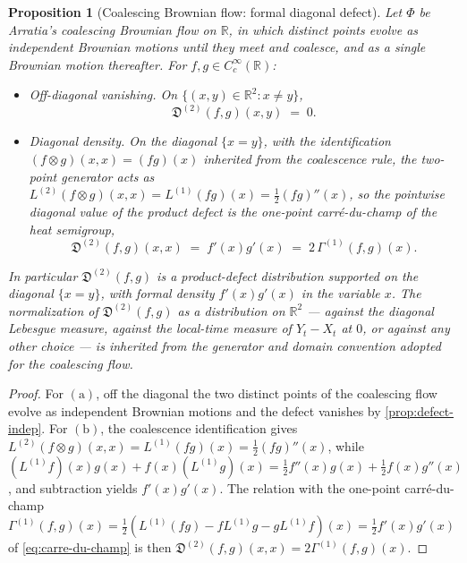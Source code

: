 \documentclass[11pt,reqno]{amsart}
\theoremstyle{plain}
\newtheorem{proposition}[theorem]{Proposition}
\theoremstyle{definition}
\theoremstyle{remark}
\newcommand{\R}{\mathbb{R}}
\begin{document}
\begin{proposition}[Coalescing Brownian flow: formal diagonal defect]\label{prop:defect-coalescing}
Let $\Phi$ be Arratia's coalescing Brownian flow on $\R$, in which
distinct points evolve as independent Brownian motions until they
meet and coalesce, and as a single Brownian motion thereafter. For
$f,g\in C_c^{\infty}(\R)$:
\begin{itemize}
\item[$(\mathrm a)$] \emph{Off-diagonal vanishing.} On
$\{(x,y)\in\R^{2}:x\neq y\}$,
\begin{equation}\label{eq:defect-coalescing-offdiag}
  \mathfrak D^{(2)}(f,g)(x,y)\;=\;0.
\end{equation}
\item[$(\mathrm b)$] \emph{Diagonal density.} On the diagonal
$\{x=y\}$, with the identification
$(f\otimes g)(x,x)=(fg)(x)$ inherited from the coalescence rule,
the two-point generator acts as
$L^{(2)}(f\otimes g)(x,x)=L^{(1)}(fg)(x)=\tfrac{1}{2}(fg)''(x)$, so
the pointwise diagonal value of the product defect is the one-point
carr\'e-du-champ of the heat semigroup,
\begin{equation}\label{eq:defect-coalescing-diag}
  \mathfrak D^{(2)}(f,g)(x,x)
  \;=\;f'(x)g'(x)
  \;=\;2\,\Gamma^{(1)}(f,g)(x).
\end{equation}
\end{itemize}
In particular $\mathfrak D^{(2)}(f,g)$ is a product-defect
distribution supported on the diagonal $\{x=y\}$, with formal density
$f'(x)g'(x)$ in the variable $x$. The normalization of
$\mathfrak D^{(2)}(f,g)$ as a distribution on $\R^{2}$ --- against the
diagonal Lebesgue measure, against the local-time measure of
$Y_t-X_t$ at $0$, or against any other choice --- is inherited from
the generator and domain convention adopted for the coalescing flow.
\end{proposition}

\begin{proof}
For $(\mathrm a)$, off the diagonal the two distinct points of the
coalescing flow evolve as independent Brownian motions and the
defect vanishes by \cref{prop:defect-indep}. For $(\mathrm b)$, the
coalescence identification gives
$L^{(2)}(f\otimes g)(x,x)=L^{(1)}(fg)(x)=\tfrac{1}{2}(fg)''(x)$,
while $(L^{(1)}f)(x)g(x)+f(x)(L^{(1)}g)(x)
=\tfrac{1}{2}f''(x)g(x)+\tfrac{1}{2}f(x)g''(x)$, and subtraction
yields $f'(x)g'(x)$. The relation with the one-point carr\'e-du-champ
$\Gamma^{(1)}(f,g)(x)=\tfrac{1}{2}(L^{(1)}(fg)-fL^{(1)}g-gL^{(1)}f)(x)=\tfrac{1}{2}f'(x)g'(x)$
of \eqref{eq:carre-du-champ} is then $\mathfrak D^{(2)}(f,g)(x,x)=2\Gamma^{(1)}(f,g)(x)$.
\end{proof}
\end{document}
